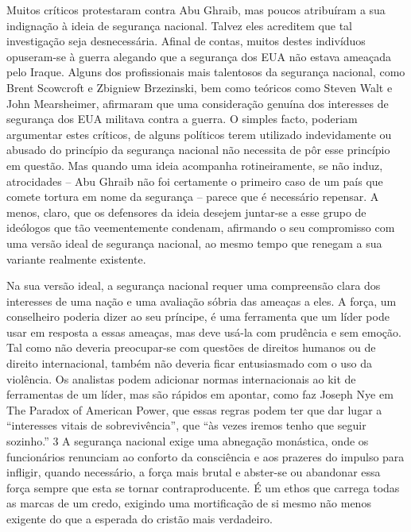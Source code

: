  \par 
Muitos críticos protestaram contra Abu Ghraib, mas poucos atribuíram a sua indignação à ideia de segurança nacional. Talvez eles acreditem que tal investigação seja desnecessária. Afinal de contas, muitos destes indivíduos opuseram-se à guerra alegando que a segurança dos EUA não estava ameaçada pelo Iraque. Alguns dos profissionais mais talentosos da segurança nacional, como Brent Scowcroft e Zbigniew Brzezinski, bem como teóricos como Steven Walt e John Mearsheimer, afirmaram que uma consideração genuína dos interesses de segurança dos EUA militava contra a guerra. O simples facto, poderiam argumentar estes críticos, de alguns políticos terem utilizado indevidamente ou abusado do princípio da segurança nacional não necessita de pôr esse princípio em questão. Mas quando uma ideia acompanha rotineiramente, se não induz, atrocidades – Abu Ghraib não foi certamente o primeiro caso de um país que comete tortura em nome da segurança – parece que é necessário repensar. A menos, claro, que os defensores da ideia desejem juntar-se a esse grupo de ideólogos que tão veementemente condenam, afirmando o seu compromisso com uma versão ideal de segurança nacional, ao mesmo tempo que renegam a sua variante realmente existente.
 \par 
Na sua versão ideal, a segurança nacional requer uma compreensão clara dos interesses de uma nação e uma avaliação sóbria das ameaças a eles. A força, um conselheiro poderia dizer ao seu príncipe, é uma ferramenta que um líder pode usar em resposta a essas ameaças, mas deve usá-la com prudência e sem emoção. Tal como não deveria preocupar-se com questões de direitos humanos ou de direito internacional, também não deveria ficar entusiasmado com o uso da violência. Os analistas podem adicionar normas internacionais ao kit de ferramentas de um líder, mas são rápidos em apontar, como faz Joseph Nye em The Paradox of American Power, que essas regras podem ter que dar lugar a “interesses vitais de sobrevivência”, que “às vezes iremos tenho que seguir sozinho.” {\color{blue}3} A segurança nacional exige uma abnegação monástica, onde os funcionários renunciam ao conforto da consciência e aos prazeres do impulso para infligir, quando necessário, a força mais brutal e abster-se ou abandonar essa força sempre que esta se tornar contraproducente. É um ethos que carrega todas as marcas de um credo, exigindo uma mortificação de si mesmo não menos exigente do que a esperada do cristão mais verdadeiro.
 \par 

